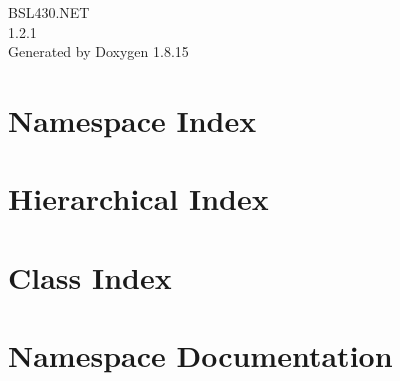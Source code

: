 \let\mypdfximage\pdfximage\def\pdfximage{\immediate\mypdfximage}\documentclass[twoside]{book}
\newcommand{\+}{\discretionary{\mbox{\scriptsize$\hookleftarrow$}}{}{}}
\newcommand{\clearemptydoublepage}{%
  \newpage{\pagestyle{empty}\cleardoublepage}%
}
\begin{document}
\hypersetup{pageanchor=false,
             bookmarksnumbered=true,
             pdfencoding=unicode
            }
\begin{titlepage}
\vspace*{7cm}
\begin{center}%
{\Large B\+S\+L430.\+N\+ET \\[1ex]\large 1.\+2.\+1 }\\
\vspace*{1cm}
{\large Generated by Doxygen 1.8.15}\\
\end{center}
\end{titlepage}
\clearemptydoublepage
{}
\tableofcontents
\clearemptydoublepage
{}
\hypersetup{pageanchor=true}

\chapter{Namespace Index}

\chapter{Hierarchical Index}

\chapter{Class Index}

\chapter{Namespace Documentation}






\end{document}

